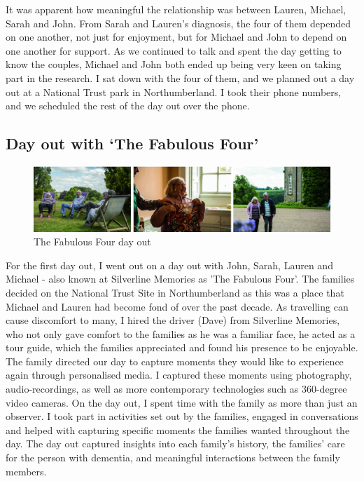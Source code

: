 It was apparent how meaningful the relationship was between Lauren, Michael, Sarah and John. From Sarah and Lauren's diagnosis, the four of them depended on one another, not just for enjoyment, but for Michael and John to depend on one another for support. As we continued to talk and spent the day getting to know the couples, Michael and John both ended up being very keen on taking part in the research. I sat down with the four of them, and we planned out a day out at a National Trust park in Northumberland. I took their phone numbers, and we scheduled the rest of the day out over the phone.

\subsection{Day out with `The Fabulous Four'}
\label{DayOutOne}

\begin{figure}[htp]
\centering
\includegraphics[width=1\linewidth]{Images/ChapterFour/FamilyDayOut.png}
\caption{The Fabulous Four day out}
\label{fig:DayOut}
\end{figure}

For the first day out, I went out on a day out with John, Sarah, Lauren and Michael - also known at Silverline Memories as 'The Fabulous Four'. The families decided on the National Trust Site in Northumberland as this was a place that Michael and Lauren had become fond of over the past decade. As travelling can cause discomfort to many, I hired the driver (Dave) from Silverline Memories, who not only gave comfort to the families as he was a familiar face, he acted as a tour guide, which the families appreciated and found his presence to be enjoyable. The family directed our day to capture moments they would like to experience again through personalised media. I captured these moments using photography, audio-recordings, as well as more contemporary technologies such as 360-degree video cameras. On the day out, I spent time with the family as more than just an observer. I took part in activities set out by the families, engaged in conversations and helped with capturing specific moments the families wanted throughout the day. The day out captured insights into each family’s history, the families’ care for the person with dementia, and meaningful interactions between the family members.

